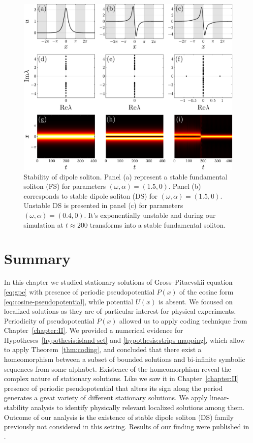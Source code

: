 \begin{figure}[h]
\centering
	\includegraphics[scale = 1]{pic/dipole soliton stability}
	\caption{
		Stability of dipole soliton.
		Panel (a) represent a stable fundamental soliton (FS) for parameters $(\omega, \alpha) = (1.5, 0)$.
		Panel (b) corresponds to stable dipole soliton (DS) for $(\omega, \alpha) = (1.5, 0)$.
		Unstable DS is presented in panel (c) for parameters $(\omega, \alpha) = (0.4, 0)$.
		It's exponentially unstable and  during our simulation at $t \approx 200$ transforms into a stable fundamental soliton.
	}
\label{fig:stability-dipole-soliton}
\end{figure}

\section{Summary}

In this chapter we studied stationary solutions of Gross--Pitaevskii equation \eqref{eq:gpe} with presence of periodic pseudopotential $P(x)$ of the cosine form \eqref{eq:cosine-pseudopotential}, while potential $U(x)$ is absent.
We focused on localized solutions as they are of particular interest for physical experiments.
Periodicity of pseudopotential $P(x)$ allowed us to apply coding technique from Chapter~\ref{chapter:II}.
We provided a numerical evidence for Hypotheses~\ref{hypothesis:island-set} and \ref{hypothesis:strips-mapping}, which allow to apply Theorem~\ref{thm:coding}, and concluded that there exist a homeomorphism between a subset of bounded solutions and bi-infinite symbolic sequences from some alphabet.
Existence of the homeomorphism reveal the complex nature of stationary solutions. 
Like we saw it in Chapter~\ref{chapter:II} presence of periodic pseudopotential that alters its sign along the period generates a great variety of different stationary solutions.
We apply linear-stability analysis to identify physically relevant localized solutions among them.
Outcome of our analysis is the existence of stable dipole soliton (DS) family previously not considered in this setting.
Results of our finding were published in \cite{LebedevAlfimovMalomed}.
